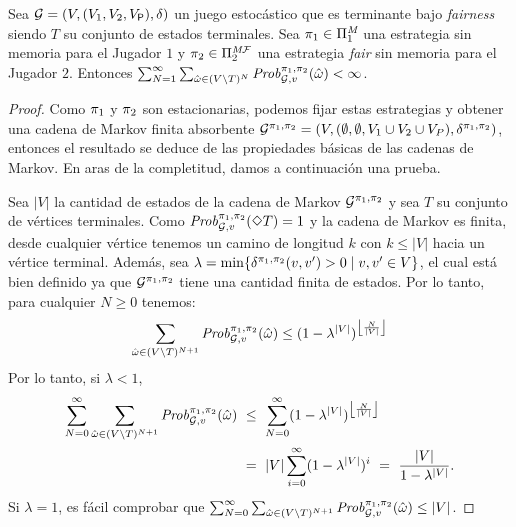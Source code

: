\begin{lemma}\label{lm:bound-prob-stationary-strats}
  Sea $\mathcal{G} = (V, (V_1, V_2, V_{\mathsf{P}}), \delta)$ un juego estocástico que es terminante bajo \textit{fairness} siendo $T$ su conjunto de estados terminales.
  Sea $\pi_{1} \in \Pi^{\textit{M}}_{1}$ una estrategia sin memoria para
  el Jugador $1$ y $\pi_{2} \in \Pi^{\textit{M}\mathcal{F}}_{2}$ una
  estrategia \textit{fair} sin memoria para el Jugador $2$.  Entonces
  $\sum^\infty_{N=1} \sum_{\hat{\omega} \in (V \setminus T)^{N}} \mathit{Prob}^{\pi_{1}, \pi_{2}}_{\mathcal{G},v}(\hat{\omega}) < \infty$.
\end{lemma}

\begin{proof}
  Como $\pi_{1}$ y $\pi_{2}$ son estacionarias, podemos fijar estas estrategias
  y obtener una cadena de Markov finita absorbente
  $\mathcal{G}^{\pi_{1},\pi_{2}} = (V, (\emptyset,\emptyset, V_1 \cup V_2 \cup V_P), \delta^{\pi_{1}, \pi_{2}})$,
  entonces el resultado se deduce de las propiedades básicas de las cadenas de Markov. En aras de la completitud, damos a continuación una prueba.
  
  Sea $|V|$ la cantidad de estados de la cadena de Markov
  $\mathcal{G}^{\pi_{1},\pi_{2}}$ y sea $T$ su conjunto de vértices terminales.
  Como $\mathit{Prob}^{\pi_{1}, \pi_{2}}_{\mathcal{G},v}(\Diamond T) = 1$
  y la cadena de Markov es finita, desde cualquier vértice tenemos un camino de longitud $k$
  con $k \leq|V|$ hacia un vértice terminal.
  Además, sea
  $\lambda = \min \{ \delta^{\pi_{1},\pi_{2}}(v,v') > 0 \mid v,v' \in V \}$,
  el cual está bien definido ya que $\mathcal{G}^{\pi_{1},\pi_{2}}$ tiene una cantidad finita de estados.
  Por lo tanto, para cualquier $N\geq 0$ tenemos:
  \[
  \sum_{\hat{\omega} \in (V \setminus T)^{N+1}} \mathit{Prob}^{\pi_{1}, \pi_{2}}_{\mathcal{G},v}(\hat{\omega}) \leq (1 - \lambda^{|V|})^{\left\lfloor{\frac{N}{|V|}}\right\rfloor}
  \]
  Por lo tanto, si $\lambda<1$,
  \begin{align*}
    \sum^\infty_{N=0}\sum_{\hat{\omega} \in (V \setminus T)^{N+1}} \Prob{\strat{1}}{\strat{2}}_{\StochG,v}(\hat{\omega}) & \ \leq \ \sum^{\infty}_{N=0}(1 - \lambda^{|V|})^{\left\lfloor{\frac{N}{|V|}}\right\rfloor} \\
    & \ = \ {|V|}\sum^{\infty}_{i=0}(1 - \lambda^{|V|})^i \ = \ \frac{|V|}{1 - \lambda^{|V|}}.
  \end{align*}
  Si $\lambda = 1$, es fácil comprobar que
  $\sum^\infty_{N=0}\sum_{\hat{\omega} \in (V \setminus T)^{N+1}} \mathit{Prob}^{\pi_{1}, \pi_{2}}_{\mathcal{G},v}(\hat{\omega}) \leq {|V|}$.
  \qedhere
\end{proof}

